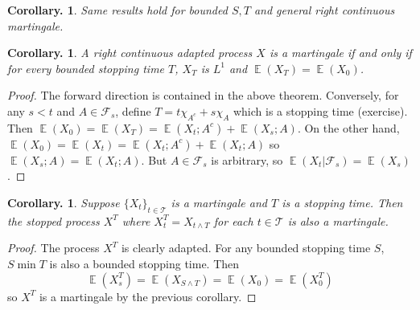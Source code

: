 \documentclass[11pt, a4paper]{memoir}
\theoremstyle{change}
\newtheorem{corollary}[theorem]{Corollary.}
\theoremstyle{plain}
\theoremstyle{nonumberplain}
\newtheorem{proof}{Proof}
\DeclareMathOperator{\E}{{\mathbb{E}}}
\numberwithin{equation}{section}
\begin{document}
\begin{corollary}
    Same results hold for bounded $S,T$ and general right continuous martingale.
\end{corollary}
\begin{corollary}
    A right continuous adapted process $X$ is a martingale if and only if for every bounded stopping time $T$, $X_T$ is $L^1$ and $\E(X_T)=\E(X_0)$.
\end{corollary}
\begin{proof}
    The forward direction is contained in the above theorem.
    Conversely, for any $s<t$ and $A\in\mathcal{F}_s$, define $T=t\chi_{A^c}+s\chi_{A}$ which is a stopping time (exercise).
    Then $\E(X_0)=\E(X_T)=\E(X_t;A^c)+\E(X_s;A)$.
    On the other hand, $\E(X_0)=\E(X_t)=\E(X_t;A^c)+\E(X_t;A)$ so $\E(X_s;A)=\E(X_t;A)$.
    But $A\in\mathcal{F}_s$ is arbitrary, so $\E(X_t|\mathcal{F}_s)=\E(X_s)$.
\end{proof}
\begin{corollary}
    Suppose $\{X_t\}_{t\in\mathcal{T}}$ is a martingale and $T$ is a stopping time.
    Then the stopped process $X^T$ where $X^T_t=X_{t\wedge T}$ for each $t\in\mathcal{T}$ is also a martingale.
\end{corollary}
\begin{proof}
    The process $X^T$ is clearly adapted.
    For any bounded stopping time $S$, $S\min T$ is also a bounded stopping time.
    Then
    \begin{equation*}
        \E(X_s^T)=\E(X_{S\wedge T})=\E(X_0)=\E(X_0^T)
    \end{equation*}
    so $X^T$ is a martingale by the previous corollary.
\end{proof}
\end{document}
